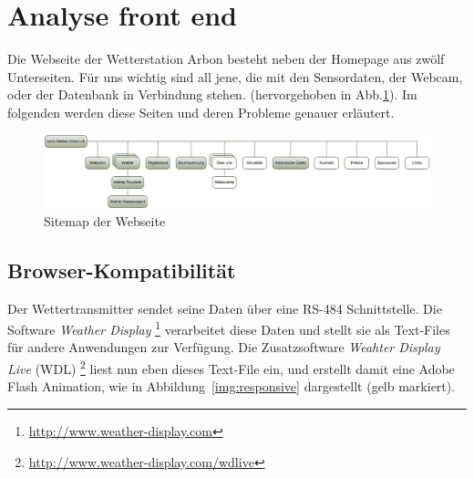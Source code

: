 \section{Analyse front end}

Die Webseite der Wetterstation Arbon besteht neben der Homepage aus zwölf Unterseiten. Für uns wichtig sind all jene, die mit den Sensordaten, der Webcam, oder der Datenbank in Verbindung stehen. (hervorgehoben in Abb.\ref{img:sitemap}). Im folgenden werden diese Seiten und deren Probleme genauer erläutert.

\begin{figure}[h!]
	\centering
	\includegraphics[width=0.9\linewidth]{img/sitemap2}
	\caption{Sitemap der Webseite}
	\label{img:sitemap}
\end{figure}


\subsection{Browser-Kompatibilität}
\label{subsec:flash}
Der Wettertransmitter sendet seine Daten über eine RS-484 Schnittstelle. Die Software \textit{Weather Display} \footnote{ \url{http://www.weather-display.com}} verarbeitet diese Daten und stellt sie als Text-Files für andere Anwendungen zur Verfügung. Die Zusatzsoftware \textit{Weahter Display Live} (WDL) \footnote{ \url{http://www.weather-display.com/wdlive}} liest nun eben dieses Text-File ein, und erstellt damit eine Adobe Flash Animation, wie in Abbildung~\ref{img:responsive} dargestellt (gelb markiert).


